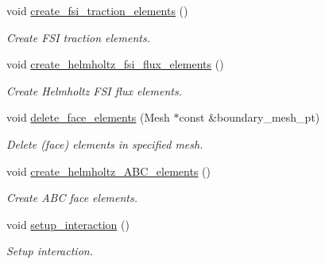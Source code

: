 \begin{DoxyCompactItemize}
void \hyperlink{classCoatedDiskProblem_a143908e8db74ad6bd8b7efaaa26c78c3}{create\+\_\+fsi\+\_\+traction\+\_\+elements} ()
\begin{DoxyCompactList}\small\item\em Create F\+SI traction elements. \end{DoxyCompactList}\item 
void \hyperlink{classCoatedDiskProblem_a34f61c03b152f2ac06e1e771b0dbe09b}{create\+\_\+helmholtz\+\_\+fsi\+\_\+flux\+\_\+elements} ()
\begin{DoxyCompactList}\small\item\em Create Helmholtz F\+SI flux elements. \end{DoxyCompactList}\item 
void \hyperlink{classCoatedDiskProblem_a55b4cead41e01ab5fd728b607f62bb74}{delete\+\_\+face\+\_\+elements} (Mesh $\ast$const \&boundary\+\_\+mesh\+\_\+pt)
\begin{DoxyCompactList}\small\item\em Delete (face) elements in specified mesh. \end{DoxyCompactList}\item 
void \hyperlink{classCoatedDiskProblem_ade4e1e8fd2e8b0f7592f26514f3d18cc}{create\+\_\+helmholtz\+\_\+\+A\+B\+C\+\_\+elements} ()
\begin{DoxyCompactList}\small\item\em Create A\+BC face elements. \end{DoxyCompactList}\item 
void \hyperlink{classCoatedDiskProblem_ad24d43389155a6a9f2f66faf4b239c26}{setup\+\_\+interaction} ()
\begin{DoxyCompactList}\small\item\em Setup interaction. \end{DoxyCompactList}\end{DoxyCompactItemize}
